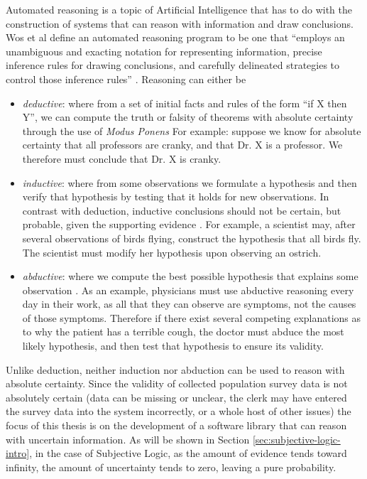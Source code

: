 \documentclass[thesis.tex]{subfiles}
\begin{document}
Automated reasoning is a topic of Artificial Intelligence that has to do with
the construction of systems that can reason with information and draw conclusions.
Wos et al define an automated reasoning program to be one that ``employs an unambiguous
and exacting notation for representing information, precise inference rules for
drawing conclusions, and carefully delineated strategies to control those inference
rules'' \cite{wos1984automated}. Reasoning can either be

\begin{itemize}
  \item \emph{deductive}: where from a set of initial facts and rules of the form ``if X then Y'',
    we can compute the truth or falsity of theorems with absolute certainty through the use of \emph{Modus Ponens} \cite{sternberg2008cognitive}
    For example: suppose we know for absolute certainty that all professors are cranky, and that
    Dr. X is a professor. We therefore must conclude that Dr. X is cranky.
  \item \emph{inductive}: where from some observations we formulate a hypothesis
    and then verify that hypothesis by testing that it holds for new observations. In contrast with deduction, inductive
    conclusions should not be certain, but probable, given the supporting evidence \cite{copi2007essentials}.
    For example, a scientist
    may, after several observations of birds flying, construct the hypothesis that all birds fly.
    The scientist must modify her hypothesis upon observing an ostrich.
  \item \emph{abductive}: where we compute the best possible hypothesis that explains
    some observation \cite{josephson1996abductive}. As an example, physicians must use abductive reasoning every day in their
    work, as all that they can observe are symptoms, not the causes of those symptoms. Therefore
    if there exist several competing explanations as to why the patient has a terrible cough,
    the doctor must abduce the most likely hypothesis, and then test that hypothesis to ensure
    its validity.
\end{itemize}

%
%


%
%



Unlike deduction, neither induction nor abduction can be used to reason with absolute certainty.
Since the validity of collected population survey data is not absolutely certain (data can be missing or
unclear, the clerk may have entered the survey data into the system incorrectly, or a whole host of
other issues) the focus of this thesis is on the development of a software library that can
reason with uncertain information. As will be shown in Section \ref{sec:subjective-logic-intro},
in the case of Subjective Logic, as the amount of evidence tends toward infinity, the amount of
uncertainty tends to zero, leaving a pure probability.
\end{document}
